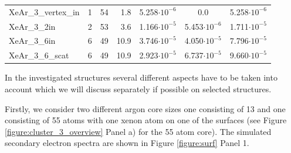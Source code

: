 \begin{table}[h]
\begin{tabular}{lrrrccc}
XeAr\_3\_vertex\_in  &      1   &     54   &  1.8  & 5.258$\cdot 10^{-6}$ & 0.0                  & 5.258$\cdot 10^{-6}$ \\
XeAr\_3\_2in         &      2   &     53   &  3.6  & 1.166$\cdot 10^{-5}$ & 5.453$\cdot 10^{-6}$ & 1.711$\cdot 10^{-5}$ \\
XeAr\_3\_6in         &      6   &     49   & 10.9  & 3.746$\cdot 10^{-5}$ & 4.050$\cdot 10^{-5}$ & 7.796$\cdot 10^{-5}$ \\
XeAr\_3\_6\_scat     &      6   &     49   & 10.9  & 2.923$\cdot 10^{-5}$ & 6.737$\cdot 10^{-5}$ & 9.660$\cdot 10^{-5}$ \\
\bottomrule
\end{tabular}
\label{table:theo_gammas}
\end{table}

In the investigated structures several different aspects have to be
taken into account which we will discuss separately if possible
on selected structures.

Firstly, we consider two different argon core sizes one consisting
of 13 and one consisting of 55 atoms with one xenon atom on one of
the surfaces (see Figure \ref{figure:cluster_3_overview} Panel a)
for the 55 atom core). The simulated secondary electron spectra are
shown in Figure \ref{figure:surf} Panel 1.

